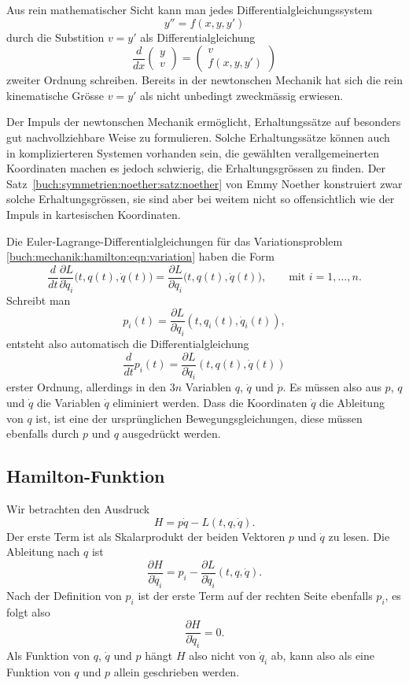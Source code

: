 Aus rein mathematischer Sicht kann man jedes Differentialgleichungssystem
\[
y'' = f(x,y,y')
\]
durch die Substition $v=y'$ als Differentialgleichung
\[
\frac{d}{dx}
\begin{pmatrix}
y\\ v
\end{pmatrix}
=
\begin{pmatrix}
v\\
f(x,y,y')
\end{pmatrix}
\]
zweiter Ordnung schreiben.
Bereits in der newtonschen Mechanik hat sich die rein kinematische
Grösse $v=y'$ als nicht unbedingt zweckmässig erwiesen.

Der Impuls der newtonschen Mechanik ermöglicht, Erhaltungssätze auf besonders
gut nachvollziehbare Weise zu formulieren.
%
Solche Erhaltungssätze können auch in komplizierteren Systemen
vorhanden sein, die gewählten verallgemeinerten Koordinaten machen
es jedoch schwierig, die Erhaltungsgrössen zu finden.
Der Satz~\ref{buch:symmetrien:noether:satz:noether} von Emmy Noether
konstruiert zwar solche Erhaltungsgrössen, sie sind aber bei weitem nicht
so offensichtlich wie der Impuls in kartesischen Koordinaten.

Die Euler-Lagrange-Differentialgleichungen für das Variationsproblem
\eqref{buch:mechanik:hamilton:eqn:variation} haben die Form
\[
\frac{d}{dt}
\frac{\partial L}{\partial \dot{q}_i}\bigl(t,q(t),\dot{q}(t)\bigr)
=
\frac{\partial L}{\partial q_i}\bigl(t,q(t),\dot{q}(t)\bigr),\qquad
\text{mit $i=1,\dots,n$}.
\]
Schreibt man
\[
p_i(t)
= 
\frac{\partial L}{\partial \dot{q}_i}(t,q_i(t),\dot{q}_i(t)),
\]
entsteht also automatisch die Differentialgleichung
\[
\frac{d}{dt} p_i(t)
=
\frac{\partial L}{\partial \dot{q}_i}(t,q(t),\dot{q}(t))
\]
erster
Ordnung, allerdings in den $3n$ Variablen $q$, $\dot{q}$ und
$\dot{p}$.
Es müssen also aus $p$, $q$ und $\dot{q}$ die Variablen $\dot{q}$
eliminiert werden.
Dass die Koordinaten $\dot{q}$ die Ableitung von $q$ ist, ist eine
der ursprünglichen Bewegungsgleichungen, diese müssen ebenfalls durch
$p$ und $q$ ausgedrückt werden.

%
%
\subsection{Hamilton-Funktion}
Wir betrachten den Ausdruck
\[
H
=
p\dot{q}
-
L(t,q,\dot{q}).
\]
Der erste Term ist als Skalarprodukt der beiden Vektoren $p$ und $\dot{q}$
zu lesen.
Die Ableitung nach $q$ ist
\[
\frac{\partial H}{\partial \dot{q}_i}
=
p_i
-
\frac{\partial L}{\partial \dot{q}_i}(t,q,\dot{q}).
\]
Nach der Definition von $p_i$ ist der erste Term auf der rechten Seite
ebenfalls $p_i$, es folgt also
\[
\frac{\partial H}{\partial \dot{q}_i} = 0.
\]
Als Funktion von $q$, $\dot{q}$ und $p$ hängt $H$ also nicht von $\dot{q}_i$
ab, kann also als eine Funktion von $q$ und $p$ allein geschrieben werden.

